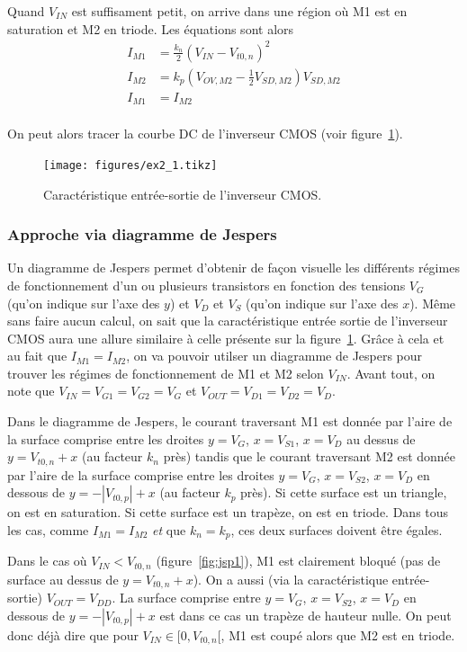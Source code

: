 \documentclass[frenchb,DIV=14]{scrartcl}
\begin{document}
Quand $V_{IN}$ est suffisament petit, on arrive dans une région où
M1 est en saturation et M2 en triode.
Les équations sont alors
\begin{align*}
    I_{M1} &= \frac{k_n}{2} (V_{IN} - V_{t0,n})^2 \\
    I_{M2} &= k_p \left(V_{OV,M2}-\frac{1}{2}V_{SD,M2}\right)V_{SD,M2} \\
    I_{M1} &= I_{M2} \\
\end{align*}

On peut alors tracer la courbe DC de l'inverseur CMOS (voir figure~\ref{fig:dc-inv}).
\begin{figure}
	\centering
	\texttt{[image: figures/ex2\_1.tikz]}
	\caption{Caractéristique entrée-sortie de l'inverseur CMOS.}
	\label{fig:dc-inv}
\end{figure}

\subsubsection*{Approche via diagramme de Jespers}
Un diagramme de Jespers permet d'obtenir de façon visuelle les différents régimes
de fonctionnement d'un ou plusieurs transistors en fonction des tensions $V_G$
(qu'on indique sur l'axe des $y$) et $V_D$ et $V_S$ (qu'on indique sur l'axe des $x$).
Même sans faire aucun calcul, on sait que la caractéristique entrée sortie de l'inverseur
CMOS aura une allure similaire à celle présente sur la figure~\ref{fig:dc-inv}. Grâce à
cela et au fait que $I_{M1} = I_{M2}$, on va pouvoir utilser un diagramme de Jespers
pour trouver les régimes de fonctionnement de M1 et M2 selon $V_{IN}$. Avant tout, on note
que $V_{IN} = V_{G1} = V_{G2} = V_G$ et $V_{OUT} = V_{D1} = V_{D2} = V_D$.

Dans le diagramme de Jespers, le courant traversant M1 est donnée par l'aire de la
surface comprise entre les droites $y = V_G$, $x = V_{S1}$, $x = V_D$ au dessus de 
$y=V_{t0,n}+x$ (au facteur $k_n$ près) tandis que le courant traversant M2 est donnée par
l'aire de la surface comprise entre les droites $y = V_G$, $x = V_{S2}$, $x = V_D$ en
dessous de $y=-|V_{t0,p}|+x$ (au facteur $k_p$ près). Si cette surface est un triangle, on est
en saturation. Si cette surface est un trapèze, on est en triode. Dans tous les cas,
comme $I_{M1} = I_{M2}$ \emph{et} que $k_n = k_p$, ces deux surfaces doivent être égales.

Dans le cas où $V_{IN} < V_{t0,n}$ (figure~\ref{fig:jsp1}), M1 est clairement bloqué (pas de
surface au dessus de $y=V_{t0,n}+x$). On a aussi (via la caractéristique entrée-sortie)
$V_{OUT} = V_{DD}$. La surface comprise entre $y = V_G$, $x = V_{S2}$, $x = V_D$
en dessous de $y=-|V_{t0,p}|+x$  est dans ce cas un trapèze de hauteur nulle.
On peut donc déjà dire que pour $V_{IN} \in [0, V_{t0,n}[$, M1 est coupé alors que
M2 est en triode.
\end{document}
